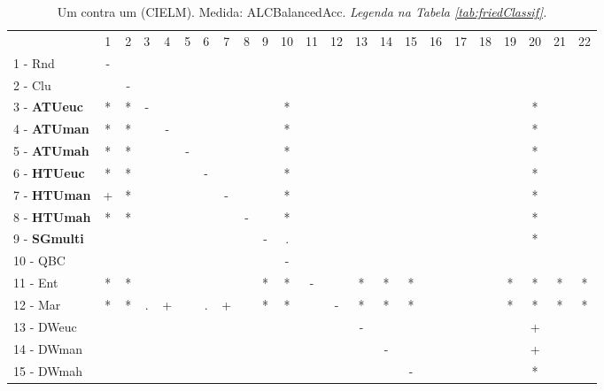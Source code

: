 \begin{table}[h]
\caption{Um contra um (CIELM). Medida: ALCBalancedAcc. \textit{Legenda na Tabela \ref{tab:friedClassif}.}}
\begin{center}\begin{tabular}{lcc|cc|cc|cc|cc|cc|cc|cc|cc|cc|cc}
 			& 1 & 2 & 3 & 4 & 5 & 6 & 7 & 8 & 9 & 10 & 11 & 12 & 13 & 14 & 15 & 16 & 17 & 18 & 19 & 20 & 21 & 22\\
1 - Rnd  	& - &   &   &   &   &   &   &   &   &   &   &   &   &   &   &   &   &   &   &   &   &   \\
2 - Clu  	&   & - &   &   &   &   &   &   &   &   &   &   &   &   &   &   &   &   &   &   &   &   \\ \hline
3 - \textbf{ATUeuc}	& * & * & - &   &   &   &   &   &   & * &   &   &   &   &   &   &   &   &   & * &   &   \\
4 - \textbf{ATUman}	& * & * &   & - &   &   &   &   &   & * &   &   &   &   &   &   &   &   &   & * &   &   \\ \hline
5 - \textbf{ATUmah}	& * & * &   &   & - &   &   &   &   & * &   &   &   &   &   &   &   &   &   & * &   &   \\
6 - \textbf{HTUeuc}	& * & * &   &   &   & - &   &   &   & * &   &   &   &   &   &   &   &   &   & * &   &   \\ \hline
7 - \textbf{HTUman}	& + & * &   &   &   &   & - &   &   & * &   &   &   &   &   &   &   &   &   & * &   &   \\
8 - \textbf{HTUmah}	& * & * &   &   &   &   &   & - &   & * &   &   &   &   &   &   &   &   &   & * &   &   \\ \hline
9 - \textbf{SGmulti}	&   &   &   &   &   &   &   &   & - & . &   &   &   &   &   &   &   &   &   & * &   &   \\
10 - QBC  	&   &   &   &   &   &   &   &   &   & - &   &   &   &   &   &   &   &   &   &   &   &   \\ \hline
11 - Ent  	& * & * &   &   &   &   &   &   & * & * & - &   & * & * & * &   &   &   & * & * & * & * \\
12 - Mar  	& * & * & . & + &   & . & + &   & * & * &   & - & * & * & * &   &   &   & * & * & * & * \\ \hline
13 - DWeuc	&   &   &   &   &   &   &   &   &   &   &   &   & - &   &   &   &   &   &   & + &   &   \\
14 - DWman	&   &   &   &   &   &   &   &   &   &   &   &   &   & - &   &   &   &   &   & + &   &   \\ \hline
15 - DWmah	&   &   &   &   &   &   &   &   &   &   &   &   &   &   & - &   &   &   &   & * &   &   \\

\end{tabular}
\end{center}
\end{table}

